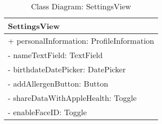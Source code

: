 \begin{table}[H]
\centering
\caption{Class Diagram: SettingsView}

\hspace{1em}
\renewcommand{\arraystretch}{1.7}

\begin{tabular}{|l|}
\hline
\textbf{SettingsView} \\
\hline
+ personalInformation: ProfileInformation \\
- nameTextField: TextField \\
- birthdateDatePicker: DatePicker \\
- addAllergenButton: Button \\
- shareDataWithAppleHealth: Toggle \\
- enableFaceID: Toggle \\
\hline
\end{tabular}
\end{table}
